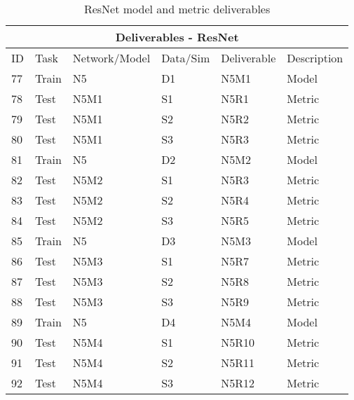 \begin{table}[]
\begin{center}
\begin{tabular}{|l|l|l|l|l|l|}
\hline
\multicolumn{6}{|c|}{Deliverables - ResNet} \\ \hline

ID & Task &  Network/Model & Data/Sim & Deliverable & Description \\ \hline\hline
77 & Train & N5 & D1 & N5M1 & Model \\ \hline
78 & Test & N5M1 & S1 & N5R1 & Metric \\ \hline
79 & Test & N5M1 & S2 & N5R2 & Metric \\ \hline
80 & Test & N5M1 & S3 & N5R3 & Metric \\ \hline\hline

81 & Train & N5 & D2 & N5M2 & Model \\ \hline
82 & Test & N5M2 & S1 & N5R3 & Metric \\ \hline
83 & Test & N5M2 & S2 & N5R4 & Metric \\ \hline
84 & Test & N5M2 & S3 & N5R5 & Metric \\ \hline\hline

85 & Train & N5 & D3 & N5M3 & Model \\ \hline
86 & Test & N5M3 & S1 & N5R7 & Metric \\ \hline
87 & Test & N5M3 & S2 & N5R8 & Metric \\ \hline
88 & Test & N5M3 & S3 & N5R9 & Metric \\ \hline\hline

89 & Train & N5 & D4 & N5M4 & Model \\ \hline
90 & Test & N5M4 & S1 & N5R10 & Metric \\ \hline
91 & Test & N5M4 & S2 & N5R11 & Metric \\ \hline
92 & Test & N5M4 & S3 & N5R12 & Metric \\ \hline 

\end{tabular}
\end{center}
\caption{ResNet model and metric deliverables}
\label{Deliverables-ResNet}
\end{table}